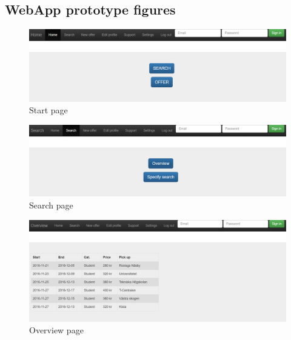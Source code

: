 \documentclass[11pt,twoside,a4paper]{report}
\begin{document}
\begin{appendices}
\chapter{WebApp prototype figures}
\label{webapp-prototype-appendix}
\newpage

\begin{figure}
	\centering
	\includegraphics[width=\textwidth]{png/webapp-start.png}
	\caption{Start page}
	\label{figure:start-page}
\end{figure}

\begin{figure}
	\centering
	\includegraphics[width=\textwidth]{png/webapp-search.png}
	\caption{Search page}
	\label{figure:search-page}
\end{figure}

\begin{figure}
	\centering
	\includegraphics[width=\textwidth]{png/webapp-overview.png}
	\caption{Overview page}
	\label{figure:overview-page}
\end{figure}


\end{appendices}
\end{document}

